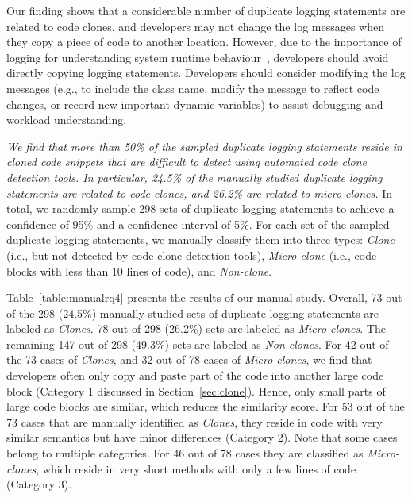 Our finding shows that a considerable number of duplicate logging statements are related to code clones, and developers may not change the log messages when they copy a piece of code to another location.
However, due to the importance of logging for understanding system runtime behaviour~\cite{petericseseip2017, Yuan:2012:CLP:2337223.2337236, Yuan:2011:ISD:1950365.1950369}, developers should avoid directly copying logging statements. Developers should consider modifying the log messages (e.g., to include the class name, modify the message to reflect code changes, or record new important dynamic variables) to assist debugging and workload understanding.




 {\em We find that more than 50\% of the sampled duplicate logging statements reside in cloned code snippets that are difficult to detect using automated code clone detection tools. In particular, 24.5\% of the manually studied duplicate logging statements are related to code clones, and 26.2\% are related to micro-clones. }
In total, we randomly sample 298 sets of duplicate logging statements to achieve a confidence of 95\% and a confidence interval of 5\%. For each set of the sampled duplicate logging statements, we manually classify them into three types: {\em Clone} (i.e., but not detected by code clone detection tools), {\em Micro-clone} (i.e., code blocks with less than 10 lines of code), and {\em Non-clone}.


Table~\ref{table:manualrq4} presents the results of our manual study. Overall, 73 out of the 298 (24.5\%) manually-studied sets of duplicate logging statements are labeled as {\em Clones}. 78 out of 298 (26.2\%) sets are labeled as {\em Micro-clones}. The remaining 147 out of 298 (49.3\%) sets are labeled as {\em Non-clones}. For 42 out of the 73 cases of {\em Clones}, and 32 out of 78 cases of {\em Micro-clones}, we find that developers often only copy and paste part of the code into another large code block (Category 1 discussed in Section~\ref{sec:clone}). Hence, only small parts of large code blocks are similar, which reduces the similarity score. For 53 out of the 73 cases that are manually identified as {\em Clones}, they reside in code with very similar semantics but have minor differences (Category 2). Note that some cases belong to multiple categories. For 46 out of 78 cases they are classified as {\em Micro-clones}, which reside in very short methods with only a few lines of code (Category 3).




